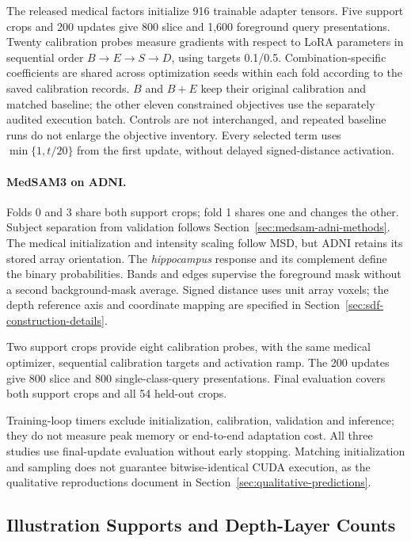\documentclass[12pt,a4paper]{article}
\begin{document}
The released medical factors initialize 916 trainable adapter tensors.
Five support crops and 200 updates give 800 slice and 1,600 foreground
query presentations. Twenty calibration probes measure gradients with
respect to LoRA parameters in sequential order $B\to E\to S\to D$,
using targets 0.1/0.5. Combination-specific coefficients are shared
across optimization seeds within each fold according to the saved
calibration records. $B$ and $B+E$ keep their original calibration and
matched baseline; the other eleven constrained objectives use the
separately audited execution batch. Controls are not interchanged,
and repeated baseline runs do not enlarge the objective inventory.
Every selected term uses $\min\{1,t/20\}$ from the first update,
without delayed signed-distance activation.

\paragraph{MedSAM3 on ADNI.}\label{sec:medsam-adni-methods-details}
Folds 0 and 3 share both support crops; fold 1 shares one and changes
the other. Subject separation from validation follows
Section~\ref{sec:medsam-adni-methods}. The medical initialization and
intensity scaling follow MSD, but ADNI retains its stored array
orientation. The \emph{hippocampus} response and its complement define
the binary probabilities. Bands and edges supervise the foreground
mask without a second background-mask average. Signed distance uses
unit array voxels; the depth reference axis and coordinate mapping are
specified in Section~\ref{sec:sdf-construction-details}.

Two support crops provide eight calibration probes, with the same
medical optimizer, sequential calibration targets and activation ramp.
The 200 updates give 800 slice and 800 single-class-query presentations.
Final evaluation covers both support crops and all 54 held-out crops.

Training-loop timers exclude initialization, calibration, validation
and inference; they do not measure peak memory or end-to-end adaptation
cost. All three studies use final-update evaluation without early
stopping. Matching initialization and sampling does not guarantee
bitwise-identical CUDA execution, as the qualitative reproductions
document in Section~\ref{sec:qualitative-predictions}.

\subsection{Illustration Supports and Depth-Layer Counts}
\label{sec:dataset-constraint-examples}
\end{document}
